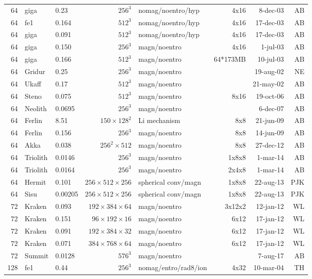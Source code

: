 \documentclass[\mydriver,12pt,twoside,notitlepage,a4paper]{article}
\begin{document}
\begin{center}
\begin{footnotesize}
\begin{longtable}{rllrlrrr}
  64 & giga  & 0.23 & $256^3$ &nomag/noentro/hyp&4x16& 8-dec-03& AB \\
  64 & fe1   & 0.164& $512^3$ &nomag/noentro/hyp&4x16&17-dec-03& AB \\
  64 & giga  & 0.091& $512^3$ &nomag/noentro/hyp&4x16&17-dec-03& AB \\
  64 & giga  & 0.150& $256^3$ & magn/noentro &  4x16  &  1-jul-03 & AB \\
  64 & giga  & 0.166& $512^3$ & magn/noentro &64*173MB& 10-jul-03 & AB \\
  64 & Gridur& 0.25 & $256^3$ & magn/noentro &        & 19-aug-02 & NE \\
  64 & Ukaff & 0.17 & $512^3$ & magn/noentro &        & 21-may-02 & AB \\
  64 & Steno & 0.075& $512^3$ & magn/noentro &  8x16  & 19-oct-06 & AB \\
  64 &Neolith&0.0695& $256^3$ & magn/noentro &        &  6-dec-07 & AB \\
  64 &Ferlin & 8.51&$150{\!\times\!}128^2$&Li mechanism& 8x8& 21-jun-09 & AB \\
  64 &Ferlin & 0.156& $256^3$ & magn/noentro &  8x8   & 14-jun-09 & AB \\
  64 & Akka  & 0.038&$256^2{\!\times\!}512$& magn/noentro & 8x8 & 27-dec-12 & AB \\
  64 &Triolith&0.0146&$256^3$ & magn/noentro & 1x8x8  &  1-mar-14 & AB \\
  64 &Triolith&0.0164&$256^3$ & magn/noentro & 2x4x8  &  1-mar-14 & AB \\
  64 &Hermit&0.101&$256{\!\times\!}512{\!\times\!}256$&spherical conv/magn&1x8x8&22-aug-13&PJK\\
  64 & Sisu  & 0.00205&$256{\!\times\!}512{\!\times\!}256$&spherical conv/magn&1x8x8&22-aug-13&PJK\\
  72 &Kraken&0.093&$192{\!\times\!}384{\!\times\!}64$&magn/noentro&3x12x2&12-jan-12&WL\\
  72 & Kraken& 0.151  &$96{\!\times\!}192{\!\times\!}16$ &magn/noentro & 6x12 &17-jan-12 & WL\\
  72 & Kraken& 0.091  &$192{\!\times\!}384{\!\times\!}32$ & magn/noentro & 6x12 &17-jan-12 & WL\\
  72 & Kraken& 0.071  &$384{\!\times\!}768{\!\times\!}64$ & magn/noentro & 6x12 &17-jan-12 & WL\\
  72 &Summit &0.0128& $576^3$ & magn/noentro &        &  7-aug-17 & AB \\
 128 & fe1   & 0.44 & $256^3$ &nomag/entro/rad8/ion&4x32&10-mar-04& TH \\

\end{longtable}
\end{footnotesize}
\end{center}
\end{document}
